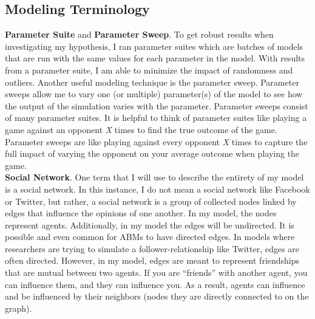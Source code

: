 \subsection{Modeling Terminology}

\textbf{Parameter Suite} and \textbf{Parameter Sweep}. To get robust results when investigating my hypothesis, I ran parameter suites which are batches of models that are run with the same values for each parameter in the model. With results from a parameter suite, I am able to minimize the impact of randomness and outliers. Another useful modeling technique is the parameter sweep. Parameter sweeps allow me to vary one (or multiple) parameter(s) of the model to see how the output of the simulation varies with the parameter. Parameter sweeps consist of many parameter suites. It is helpful to think of parameter suites like playing a game against an opponent \textit{X} times to find the true outcome of the game. Parameter sweeps are like playing against every opponent \textit{X} times to capture the full impact of varying the opponent on your average outcome when playing the game.\\

\textbf{Social Network}. One term that I will use to describe the entirety of my model is a social network. In this instance, I do not mean a social network like Facebook or Twitter, but rather, a social network is a group of collected nodes linked by edges that influence the opinions of one another. In my model, the nodes represent agents. Additionally, in my model the edges will be undirected. It is possible and even common for ABMs to have directed edges. In models where researchers are trying to simulate a follower-relationship like Twitter, edges are often directed. However, in my model, edges are meant to represent friendships that are mutual between two agents. If you are ``friends'' with another agent, you can influence them, and they can influence you. As a result, agents can influence and be influenced by their neighbors (nodes they are directly connected to on the graph). 

